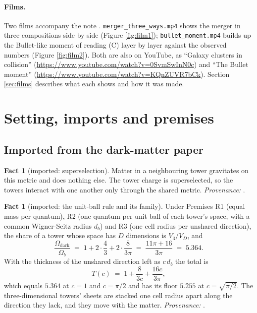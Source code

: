 \documentclass[11pt]{article}
\theoremstyle{definition}
\newtheorem{fact}[theorem]{Fact}
\newcommand{\file}[1]{\texttt{#1}}
\begin{document}
\paragraph{Films.} Two films accompany the note \cite{ButlerSuppT14b}. \file{merger\_three\_ways.mp4} shows the merger in three compositions side by side (Figure \ref{fig:film1}); \file{bullet\_moment.mp4} builds up the Bullet-like moment of reading (C) layer by layer against the observed numbers (Figure \ref{fig:film2}). Both are also on YouTube, as ``Galaxy clusters in collision'' (\url{https://www.youtube.com/watch?v=0SvmSwInN0c}) and ``The Bullet moment'' (\url{https://www.youtube.com/watch?v=KQnZUVR7bCk}). Section \ref{sec:films} describes what each shows and how it was made.

\section{Setting, imports and premises}\label{sec:setting}

\subsection{Imported from the dark-matter paper}

\begin{fact}[imported: superselection]\label{fact:stable}
Matter in a neighbouring tower gravitates on this metric and does nothing else. The tower charge is superselected, so the towers interact with one another only through the shared metric. \emph{Provenance:} \cite[Prop.~4.1]{ButlerT14}.
\end{fact}

\begin{fact}[imported: the unit-ball rule and its family]\label{fact:rule}
Under Premises R1 (equal mass per quantum), R2 (one quantum per unit ball of each tower's space, with a common Wigner-Seitz radius $d_{b}$) and R3 (one cell radius per unshared direction), the share of a tower whose space has $D$ dimensions is $V_{3}/V_{D}$, and
\[
\frac{\Omega_{\mathrm{dark}}}{\Omega_{b}} \;=\; 1 + 2\cdot\frac{4}{3} + 2\cdot\frac{8}{3\pi} \;=\; \frac{11\pi + 16}{3\pi} \;=\; 5.364 .
\]
With the thickness of the unshared direction left as $c\,d_{b}$ the total is
\[
T(c) \;=\; 1 + \frac{8}{3c} + \frac{16c}{3\pi},
\]
which equals $5.364$ at $c = 1$ and $c = \pi/2$ and has its floor $5.255$ at $c = \sqrt{\pi/2}$. The three-dimensional towers' sheets are stacked one cell radius apart along the direction they lack, and they move with the matter. \emph{Provenance:} \cite[Prems.~7.2 to 7.4, Props.~7.6, 7.15 and 7.28]{ButlerT14}.
\end{fact}
\end{document}
